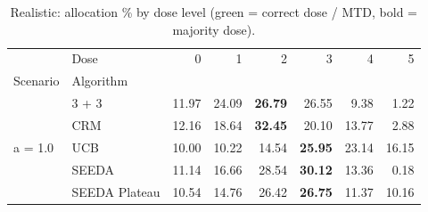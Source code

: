 \begin{table}[H]
\centering
\caption{Realistic: allocation \% by dose level (green = correct dose / MTD, bold = majority dose).}
\label{tab:real_alloc_by_dose}
\begin{tabular}{llrrrrrr}
\toprule
 & Dose & 0 & 1 & 2 & 3 & 4 & 5 \\
Scenario & Algorithm &  &  &  &  &  &  \\
\midrule
\multirow[c]{5}{*}{a = 1.0} & 3 + 3 & 11.97 & 24.09 & {\cellcolor[HTML]{C8E6C9}} \bfseries 26.79 & 26.55 & 9.38 & 1.22 \\
 & CRM & 12.16 & 18.64 & {\cellcolor[HTML]{C8E6C9}} \bfseries 32.45 & 20.10 & 13.77 & 2.88 \\
 & UCB & 10.00 & 10.22 & {\cellcolor[HTML]{C8E6C9}} 14.54 & \bfseries 25.95 & 23.14 & 16.15 \\
 & SEEDA & 11.14 & 16.66 & {\cellcolor[HTML]{C8E6C9}} 28.54 & \bfseries 30.12 & 13.36 & 0.18 \\
 & SEEDA Plateau & 10.54 & 14.76 & {\cellcolor[HTML]{C8E6C9}} 26.42 & \bfseries 26.75 & 11.37 & 10.16 \\
\bottomrule
\end{tabular}
\end{table}
